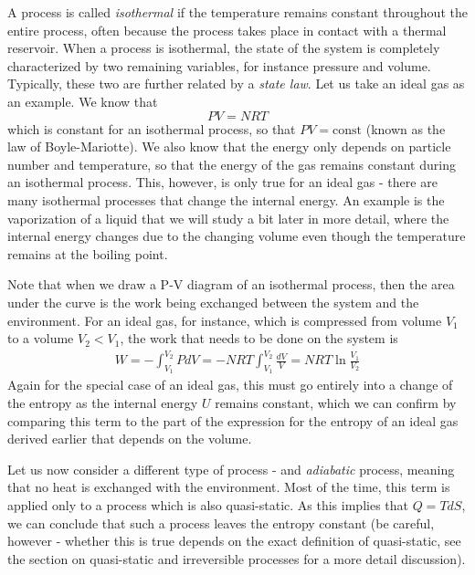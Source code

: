 \documentclass[a4paper, draft]{article}
\theoremstyle{own}
\theoremstyle{remark}
\begin{document}
A process is called {\em isothermal} if the temperature remains constant throughout the entire process, often because the process takes place in contact with a thermal reservoir. When a process is isothermal, the state of the system is completely characterized by two remaining variables, for instance pressure and volume. Typically, these two are further related by a {\em state law}. Let us take an ideal gas as an example. We know that 
$$
PV = N R T
$$
which is constant for an isothermal process, so that $PV = \text{const}$ (known as the law of Boyle-Mariotte). We also know that the energy only depends on particle number and temperature, so that the energy of the gas remains constant during an isothermal process. This, however, is only true for an ideal gas - there are many isothermal processes that change the internal energy. An example is the vaporization of a liquid that we will study a bit later in more detail, where the internal energy changes due to the changing volume even though the temperature remains at the boiling point.

Note that when we draw a P-V diagram of an isothermal process, then the area under the curve is the work being exchanged between the system and the environment. For an ideal gas, for instance, which is compressed from volume $V_1$ to a volume $V_2 < V_1$, the work that needs to be done on the system is
\begin{align*}
W = - \int_{V_1}^{V_2} P dV = -  NRT \int_{V_1}^{V_2} \frac{dV}{V} = NRT \ln \frac{V_1}{V_2}
\end{align*}
Again for the special case of an ideal gas, this must go entirely into a change of the entropy as the internal energy $U$ remains constant, which we can confirm by comparing this term to the part of the expression for the entropy of an ideal gas derived earlier that depends on the volume.

Let us now consider a different type of process - and {\em adiabatic} process, meaning that no heat is exchanged with the environment. Most of the time, this term is applied only to a process which is also quasi-static. As this implies that $Q = T dS$, we can conclude that such a process leaves the entropy constant (be careful, however - whether this is true depends on the exact definition of quasi-static, see the section on quasi-static and irreversible processes for a more detail discussion).
\end{document}
